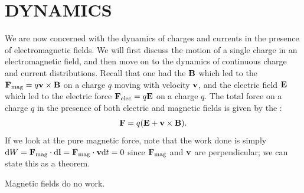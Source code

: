\chapter{DYNAMICS}

We are now concerned with the dynamics of charges and currents in the presence of electromagnetic fields. We will first discuss the motion of a single charge in an electromagnetic field, and then move on to the dynamics of continuous charge and current distributions. Recall that one had the  $\mathbf{B}$ which led to the  $\mathbf{F}_{\text{mag}} = q \mathbf{v} \times \mathbf{B}$ on a charge $q$ moving with velocity $\mathbf{v}$, and the electric field $\mathbf{E}$ which led to the electric force $\mathbf{F}_{\text{elec}} = q \mathbf{E}$ on a charge $q$. The total force on a charge $q$ in the presence of both electric and magnetic fields is given by the :
\begin{align}
\mathbf{F} = q (\mathbf{E} + \mathbf{v} \times \mathbf{B}).
\end{align}
If we look at the pure magnetic force, note that the work done is simply $\mathrm{d}W = \mathbf{F}_{\text{mag}} \cdot \mathrm{d}\mathbf{l} = \mathbf{F}_{\text{mag}} \cdot \mathbf{v} \mathrm{d}t = 0$ since $\mathbf{F}_{\text{mag}}$ and $\mathbf{v}$ are perpendicular; we can state this as a theorem.

\begin{theorem}
    Magnetic fields do no work.
\end{theorem}

